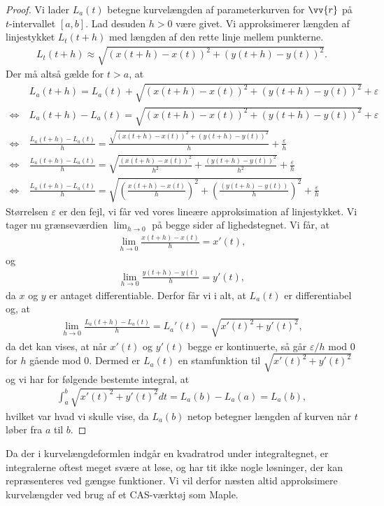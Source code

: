 \begin{proof}
	Vi lader $L_a(t)$ betegne kurvelængden af parameterkurven for $\vv{r}$ på $t$-intervallet $[a,b]$. Lad desuden $h>0$ være givet. Vi approksimerer længden af linjestykket $L_t(t+h)$ med længden af 
	den rette linje mellem punkterne.
	\begin{align*}
		L_t(t+h) \approx \sqrt{(x(t+h)-x(t))^2+(y(t+h)-y(t))^2}.		
	\end{align*}
	Der må altså gælde for $t>a$, at 
	\begin{align*}
						&L_ a(t+h) = L_a(t) + \sqrt{(x(t+h)-x(t))^2 + (y(t+h)-y(t))^2} + \varepsilon \\
		\Leftrightarrow \ & L_a(t+h) -L_a(t) = \sqrt{(x(t+h)-x(t))^2 + (y(t+h)-y(t))^2} + \varepsilon  \\
		\Leftrightarrow \ & \frac{L_a(t+h) -L_a(t)}{h} = \frac{\sqrt{(x(t+h)-x(t))^2 + (y(t+h)-y(t))^2}}{h} +  \frac{\varepsilon}{h} \\
		\Leftrightarrow \ & \frac{L_a(t+h) -L_a(t)}{h} = \sqrt{\frac{(x(t+h)-x(t))^2}{h^2} + \frac{(y(t+h)-y(t))^2}{h^2}} + \frac{\varepsilon}{h}  \\
		\Leftrightarrow	\ & \frac{L_a(t+h) -L_a(t)}{h} = \sqrt{\left(\frac{x(t+h)-x(t)}{h}\right)^2 + \left(\frac{(y(t+h)-y(t))}{h}\right)^2}  + \frac{\varepsilon}{h}
	\end{align*}
	Størrelsen $\varepsilon$ er den fejl, vi får ved vores lineære approksimation af linjestykket. 
	Vi tager nu grænseværdien $\lim_{h\to 0}$ på begge sider af lighedstegnet. Vi får, at
	\begin{align*}
		\lim_{h\to 0} \frac{x(t+h)-x(t)}{h} = x'(t),
	\end{align*}
	og
	\begin{align*}
		\lim_{h \to 0} \frac{y(t+h)-y(t)}{h} = y'(t),
	\end{align*}
	da $x$ og $y$ er antaget differentiable. Derfor får vi i alt, at $L_a(t)$ er differentiabel og, at
	\begin{align*}
		\lim_{h\to 0} \frac{L_a(t+h)-L_a(t)}{h} = L_a'(t) = \sqrt{x'(t)^2 +y'(t)^2},
	\end{align*}
	da det kan vises, at når $x'(t)$ og $y'(t)$ begge er kontinuerte, så går $\varepsilon/h$ mod $0$ for $h$ gående mod $0$. 
	Dermed er $L_a(t)$ en stamfunktion til $\sqrt{x'(t)^2+y'(t)^2}$ og vi har for følgende bestemte integral, at 
	\begin{align*}
		\int_a^b \sqrt{x'(t)^2+y'(t)^2} dt = L_a(b)-L_a(a) = L_a(b),	
	\end{align*}
	hvilket var hvad vi skulle vise, da $L_a(b)$ netop betegner længden af kurven når $t$ løber fra $a$ til $b$.
\end{proof}
Da der i kurvelængdeformlen indgår en kvadratrod under integraltegnet, er integralerne oftest meget svære at løse, og har tit ikke nogle løsninger, der kan repræsenteres ved gængse funktioner. Vi vil derfor næsten altid approksimere kurvelængder ved brug af et CAS-værktøj som Maple.


